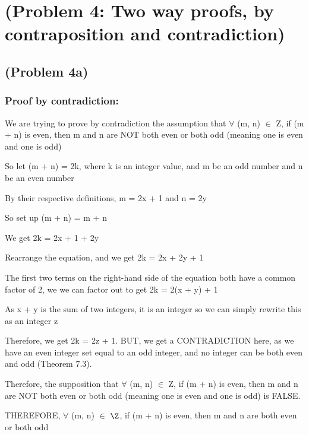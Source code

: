 \documentclass{article}
\begin{document}
\section{(Problem 4: Two way proofs, by contraposition and contradiction)}

\subsection{(Problem 4a)}
\subsubsection{Proof by contradiction: }

We are trying to prove by contradiction the assumption that $\forall$ (m, n) $\in$ Z, if (m + n) is even, then m and n are NOT both even or both odd (meaning one is even and one is odd)

\par\vspace{0.5cm}\noindent
So let (m + n) = 2k, where k is an integer value, and m be an odd number and n be an even number \par\noindent
By their respective definitions, m = 2x + 1 and n = 2y
\par\vspace{0.5cm}\noindent
So set up (m + n) = m + n
\par\vspace{0.5cm}\noindent
We get 2k = 2x + 1 + 2y
\par\vspace{0.5cm}\noindent
Rearrange the equation, and we get 2k = 2x + 2y + 1
\par\vspace{0.5cm}\noindent The first two terms on the right-hand side of the equation both have a common factor of 2, we we can factor out to get 2k = 2(x + y) + 1
\par\vspace{0.5cm}\noindent As x + y is the sum of two integers, it is an integer so we can simply rewrite this as an integer z
\par\vspace{0.5cm}\noindent Therefore, we get 2k = 2z + 1.  BUT, we get a CONTRADICTION here, as we have an even integer set equal to an odd integer, and no integer can be both even and odd (Theorem 7.3).
\par\vspace{0.5cm}\noindent Therefore, the supposition that $\forall$ (m, n) $\in$ Z, if (m + n) is even, then m and n are NOT both even or both odd (meaning one is even and one is odd) is FALSE.
\par\vspace{0.5cm}\noindent THEREFORE, $\forall$ (m, n) $\in$ $\Z$, if (m + n) is even, then m and n are both even or both odd
\end{document}
